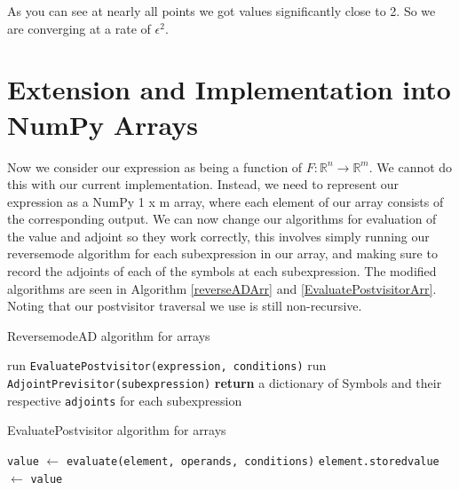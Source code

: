 \documentclass{article}
\begin{document}
As you can see at nearly all points we got values significantly close to 2. So we are converging at a rate of $\epsilon^2$.





\section{Extension and Implementation into NumPy Arrays}

Now we consider our expression as being a function of $F: \mathbb{R}^n \longrightarrow \mathbb{R}^m$. We cannot do this with our current implementation. Instead, we need to represent our expression as a NumPy 1 x m array, where each element of our array consists of the corresponding output. We can now change our algorithms for evaluation of the value and adjoint so they work correctly, this involves simply running our reversemode algorithm for each subexpression in our array, and making sure to record the adjoints of each of the symbols at each subexpression. The modified algorithms are seen in Algorithm \ref{reverseADArr} and \ref{EvaluatePostvisitorArr}. Noting that our postvisitor traversal we use is still non-recursive.

\begin{algorithm}[h]
\caption{ReversemodeAD algorithm for arrays}\label{reverseADArr}
\begin{algorithmic}[1]
\State run \verb|EvaluatePostvisitor(expression, conditions)|
\State run \verb|AdjointPrevisitor(subexpression)|
\EndFor
\State \textbf{return} a dictionary of Symbols and their respective \verb|adjoints| for each subexpression
\EndProcedure
\end{algorithmic}
\end{algorithm}

\begin{algorithm}[h!]
\caption{EvaluatePostvisitor algorithm for arrays}\label{EvaluatePostvisitorArr}
\begin{algorithmic}[1]
\State \verb|value| $\gets$ \verb|evaluate(element, operands, conditions)|
\State \verb|element.storedvalue| $\gets$ \verb|value|
\EndFor
\EndFor
\EndProcedure
\end{algorithmic}
\end{algorithm}
\end{document}

